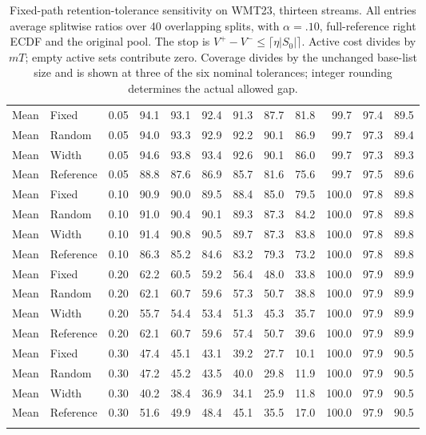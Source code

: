 \begin{table}[t]
\begin{tabular}{llrrrrrrrrrr}
Mean & Fixed & 0.05 & 94.1 & 93.1 & 92.4 & 91.3 & 87.7 & 81.8 & 99.7 & 97.4 & 89.5 \\
Mean & Random & 0.05 & 94.0 & 93.3 & 92.9 & 92.2 & 90.1 & 86.9 & 99.7 & 97.3 & 89.4 \\
Mean & Width & 0.05 & 94.6 & 93.8 & 93.4 & 92.6 & 90.1 & 86.0 & 99.7 & 97.3 & 89.3 \\
Mean & Reference & 0.05 & 88.8 & 87.6 & 86.9 & 85.7 & 81.6 & 75.6 & 99.7 & 97.5 & 89.6 \\
\addlinespace
Mean & Fixed & 0.10 & 90.9 & 90.0 & 89.5 & 88.4 & 85.0 & 79.5 & 100.0 & 97.8 & 89.8 \\
Mean & Random & 0.10 & 91.0 & 90.4 & 90.1 & 89.3 & 87.3 & 84.2 & 100.0 & 97.8 & 89.8 \\
Mean & Width & 0.10 & 91.4 & 90.8 & 90.5 & 89.7 & 87.3 & 83.8 & 100.0 & 97.8 & 89.8 \\
Mean & Reference & 0.10 & 86.3 & 85.2 & 84.6 & 83.2 & 79.3 & 73.2 & 100.0 & 97.8 & 89.8 \\
\addlinespace
Mean & Fixed & 0.20 & 62.2 & 60.5 & 59.2 & 56.4 & 48.0 & 33.8 & 100.0 & 97.9 & 89.9 \\
Mean & Random & 0.20 & 62.1 & 60.7 & 59.6 & 57.3 & 50.7 & 38.8 & 100.0 & 97.9 & 89.9 \\
Mean & Width & 0.20 & 55.7 & 54.4 & 53.4 & 51.3 & 45.3 & 35.7 & 100.0 & 97.9 & 89.9 \\
Mean & Reference & 0.20 & 62.1 & 60.7 & 59.6 & 57.4 & 50.7 & 39.6 & 100.0 & 97.9 & 89.9 \\
\addlinespace
Mean & Fixed & 0.30 & 47.4 & 45.1 & 43.1 & 39.2 & 27.7 & 10.1 & 100.0 & 97.9 & 90.5 \\
Mean & Random & 0.30 & 47.2 & 45.2 & 43.5 & 40.0 & 29.8 & 11.9 & 100.0 & 97.9 & 90.5 \\
Mean & Width & 0.30 & 40.2 & 38.4 & 36.9 & 34.1 & 25.9 & 11.8 & 100.0 & 97.9 & 90.5 \\
Mean & Reference & 0.30 & 51.6 & 49.9 & 48.4 & 45.1 & 35.5 & 17.0 & 100.0 & 97.9 & 90.5 \\
\addlinespace
\bottomrule
\end{tabular}
\caption{Fixed-path retention-tolerance sensitivity on WMT23, thirteen streams. All entries average splitwise ratios over 40 overlapping splits, with $\alpha=.10$, full-reference right ECDF and the original pool. The stop is $V^+-V^-\le\lceil\eta|S_0|\rceil$. Active cost divides by $mT$; empty active sets contribute zero. Coverage divides by the unchanged base-list size and is shown at three of the six nominal tolerances; integer rounding determines the actual allowed gap.}
\label{tab:tolerance-all-1}
\end{table}

